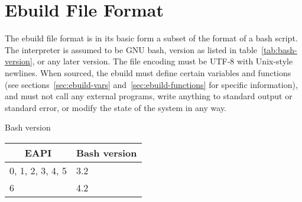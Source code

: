 \chapter{Ebuild File Format}
\label{sec:ebuild-format}

 The ebuild file format is in its basic form a subset of the format of
a bash script. The interpreter is assumed to be GNU bash, version as listed in
table~\ref{tab:bash-version}, or any later version.
The file encoding must be UTF-8 with Unix-style newlines. When sourced, the ebuild must define
certain variables and functions (see sections~\ref{sec:ebuild-vars} and~\ref{sec:ebuild-functions}
for specific information), and must not call any external programs, write anything to standard
output or standard error, or modify the state of the system in any way.

\begin{centertable}{Bash version}
    \label{tab:bash-version}
    \begin{tabular}{ll}
      \toprule
      \multicolumn{1}{c}{\textbf{EAPI}} &
      \multicolumn{1}{c}{\textbf{Bash version}} \\
      \midrule
      0, 1, 2, 3, 4, 5  & 3.2 \\
      6                 & 4.2 \\
      \bottomrule
    \end{tabular}
\end{centertable}


